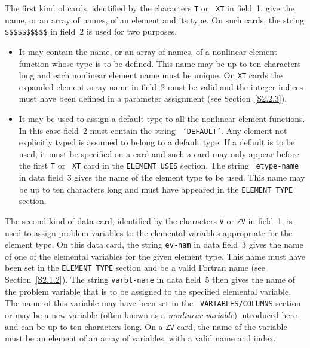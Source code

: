 \documentclass[a4paper]{article}
\begin{document}
The first kind of cards, identified by the characters {\tt  T} or {\tt
XT}
in field~1, give the name, or an array
of names, of an element and its
type.  On such cards,
the string {\tt \$\$\$\$\$\$\$\$\$\$} in field~2
is used for two purposes.
\begin{itemize}
\item
It may contain the name, or an array of
names, of a  nonlinear element
function whose  type is to be defined.   This  name may  be  up to ten
characters  long and each nonlinear element  name
must be unique.  On
{\tt  XT}
cards  the expanded element  array name
in  field~2 must be
valid and the integer  indices must have  been  defined in a parameter
assignment (see Section~\ref{S2.2.3}).

\item
It may be used to assign a  default type
to all the  nonlinear element
functions.   In   this case field~2    must contain   the string  {\tt
`DEFAULT'}.  Any element not explicitly  typed
is assumed to belong to
a default type.  If a default is to be used, it must be specified on a
card
and such a card may only appear before the first  {\tt T} or {\tt
XT}    card in the {\tt  ELEMENT   USES}
section.   The  string   {\tt
etype-name} in data field~3 gives the name of the  element
type to be
used.   This  name may be up  to  ten characters   long and must  have
appeared in the {\tt ELEMENT TYPE} section.
\end{itemize}

The second kind of data card, identified by the  characters {\tt V} or
{\tt  ZV}
in  field~1, is used  to  assign problem variables
to   the elemental  variables
appropriate for the  element type.   On this data
card,
the string  {\tt ev-nam} in data  field~3 gives the name of one
of the elemental variables for the given element type.
This name must
have been set in the {\tt ELEMENT TYPE}
section and be a valid Fortran
name (see Section~\ref{S2.1.2}).  The string {\tt varbl-name} in data
field~5 then gives the name of the problem variable
that is  to be assigned to  the specified elemental variable.
The name   of  this   variable   may  have  been    set in  the   {\tt
VARIABLES/COLUMNS}
section  or may be  a new  variable (often known  as  a {\em nonlinear
variable}) introduced here and can  be up to ten  characters long.  On
a {\tt ZV}
card,
the name of the variable  must be  an element  of an   array
of variables, with a valid name and index.
\end{document}
